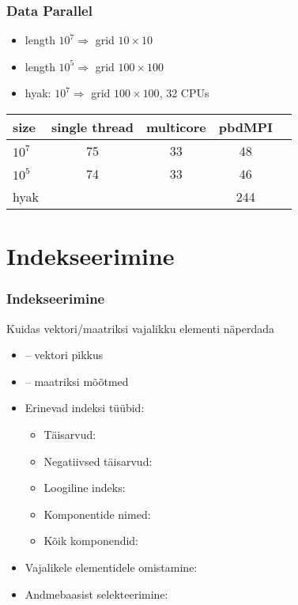 \documentclass[pdftex]{beamer}
\begin{document}
\begin{frame}
  \frametitle{Data Parallel}
  \begin{itemize}
  \item length $10^{7} \Rightarrow$ grid $10\times10$
  \item length $10^{5} \Rightarrow$ grid $100\times100$
  \item hyak:  $10^{7} \Rightarrow$ grid $100\times100$, 32 CPUs
  \end{itemize}
  \begin{tabular}{l cccc}
    \toprule
    size      & single thread & multicore & pbdMPI\\
    \midrule
    $10^{7}$  & 75            & 33        & 48     \\
    $10^{5}$  & 74            & 33        & 46    \\
    hyak      &               &           & 244 \\
    \bottomrule
  \end{tabular}
\end{frame}


\section{Indekseerimine}

\begin{frame}
  \frametitle{Indekseerimine}
  Kuidas vektori/maatriksi vajalikku elementi näperdada
  \begin{itemize}
  \item {} -- vektori pikkus
  \item {} -- maatriksi mõõtmed
    \pause
  \item Erinevad indeksi tüübid:
    \begin{itemize}
    \item Täisarvud: 
    \item Negatiivsed täisarvud: 
    \item Loogiline indeks: 
    \item Komponentide nimed: 
    \item Kõik komponendid: 
    \end{itemize}
    \pause
  \item Vajalikele elementidele omistamine:\\
  \item Andmebaasist selekteerimine:\\
  \end{itemize}
\end{frame}
\end{document}
